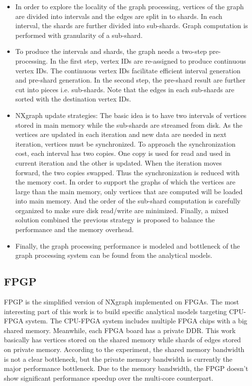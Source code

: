 \begin{itemize}
    \item In order to explore the locality of the graph processing, vertices of
        the graph are divided into intervals and the edges are split in to
        shards. In each interval, the shards are further divided into
        sub-shards. Graph computation is performed with granularity of a
        sub-shard. 

    \item To produce the intervals and shards, the graph needs a two-step
        pre-processing. In the first step, vertex IDs are re-assigned to produce
        continuous vertex IDs. The continuous vertex IDs facilitate efficient
        interval generation and pre-shard generation. In the second step, the
        pre-shard result are further cut into pieces i.e. sub-shards. Note that
        the edges in each sub-shards are sorted with the destination vertex
        IDs.

    \item NXgraph update strategies: The basic idea is to have two intervals of
        vertices stored in main memory while the sub-shards are streamed from
        disk. As the vertices are updated in each iteration and new data are
        needed in next iteration, vertices must be synchronized. To approach the
        synchronization cost, each interval has two copies. One copy is used for
        read and used in current iteration and the other is updated. When the
        iteration moves forward, the two copies swapped. Thus the
        synchronization is reduced with the memory cost. In order to support
        the graphs of which the vertices are large than the main memory, only vertices that
        are computed will be loaded into main memory. And the order of the
        sub-shard computation is carefully organized to make sure disk
        read/write are minimized. Finally, a mixed solution combined the
        previous strategy is proposed to balance the performance and the
        memory overhead. 
    \item Finally, the graph processing performance is modeled and
        bottleneck of the graph processing system can be found from the
        analytical models.
\end{itemize}

\subsection{FPGP}
FPGP \cite{dai2016fpgp} is the simplified version of NXgraph implemented on FPGAs. The most
interesting part of this work is to build specific analytical models targeting CPU-FPGA
system. The CPU-FPGA system includes multiple FPGA chips with a big shared
memory. Meanwhile, each FPGA board has a private DDR. This work basically has
vertices stored on the shared memory while shards of edges stored on private
memory. According to the experiment, the shared memory bandwidth is not a clear
bottleneck, but the private memory bandwidth is currently the major performance
bottleneck. Due to the memory bandwidth, the FPGP doesn't show significant
performance speedup over the multi-core counterpart.
